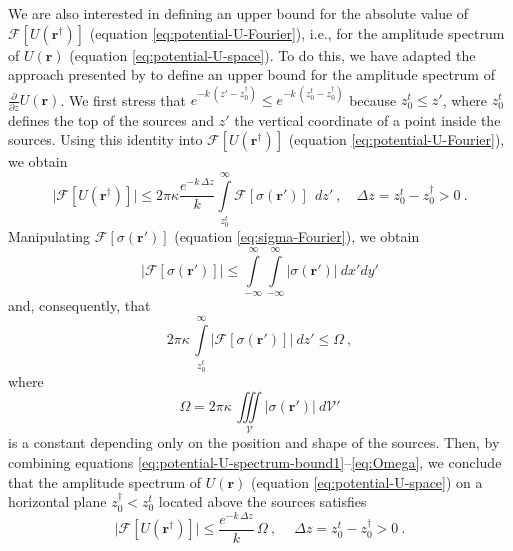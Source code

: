 We are also interested in defining an upper bound for the absolute value
of $\mathcal{F} [ U(\mathbf{r}^{\dagger}) ]$ (equation \ref{eq:potential-U-Fourier}), 
i.e., for the amplitude spectrum of $U(\mathbf{r})$ (equation \ref{eq:potential-U-space}). 
To do this, we have adapted the approach presented by
\citet{bhattacharyya1967} to define an upper bound for the amplitude spectrum of 
$\tfrac{\partial}{\partial z} U(\mathbf{r})$. 
We first stress that 
$e^{- k \, (z' - z^{\dagger}_{0})} \le e^{- k \, (z^{t}_{0} - z^{\dagger}_{0})}$ because
$z^{t}_{0} \le z'$, where $z^{t}_{0}$ defines the top of the sources and $z'$ the vertical
coordinate of a point inside the sources. Using this identity into  
$\mathcal{F} [ U(\mathbf{r}^{\dagger}) ]$ (equation \ref{eq:potential-U-Fourier}), we obtain
\begin{equation}
	\vert \mathcal{F} [ U(\mathbf{r}^{\dagger}) ] \vert \le 2 \pi \kappa 
	\frac{e^{- k \, \Delta z}}{k}
	\int\limits_{z^{t}_{0}}^{\infty}
	\mathcal{F} [ \sigma(\mathbf{r}') ] \:
	\: dz' \: , \quad \Delta z = z^{t}_{0} - z^{\dagger}_{0} > 0 \: .
	\label{eq:potential-U-spectrum-bound1}
\end{equation}
Manipulating $\mathcal{F} [ \sigma(\mathbf{r}') ]$ (equation \ref{eq:sigma-Fourier}), 
we obtain
\begin{equation}
	\vert \mathcal{F} [ \sigma(\mathbf{r}') ] \vert \le
	\int\limits_{-\infty}^{\infty}\int\limits_{-\infty}^{\infty}
	\vert \sigma(\mathbf{r}') \vert 
	\: dx'dy'
	\label{eq:sigma-spectrum-bound}
\end{equation}
and, consequently, that
\begin{equation}
	2 \pi \kappa \, 
	\int\limits_{z^{t}_{0}}^{\infty}
	\vert \mathcal{F} [ \sigma(\mathbf{r}') ] \vert
	\: dz' \le \Omega \: ,
	\label{eq:Omega-bound}
\end{equation}
where
\begin{equation}
	\Omega = 2 \pi \kappa \, \iiint\limits_{\mathcal{V}}
	\vert \sigma(\mathbf{r}') \vert 
	\: d\mathcal{V}'
	\label{eq:Omega}
\end{equation}
is a constant depending only on the position and shape of the sources. 
Then, by combining equations 
\ref{eq:potential-U-spectrum-bound1}--\ref{eq:Omega},
we conclude that the amplitude spectrum of 
$U(\mathbf{r})$ (equation \ref{eq:potential-U-space}) on a horizontal plane 
$z^{\dagger}_{0} < z^{t}_{0}$ located above the sources satisfies 
\begin{equation}
	\vert \mathcal{F} [ U(\mathbf{r}^{\dagger}) ] \vert \le
	\frac{e^{- k \, \Delta z}}{k} \, \Omega \: ,
	\: \quad \Delta z = z^{t}_{0} - z^{\dagger}_{0} > 0 \: .
	\label{eq:potential-U-spectrum-bound}
\end{equation}
